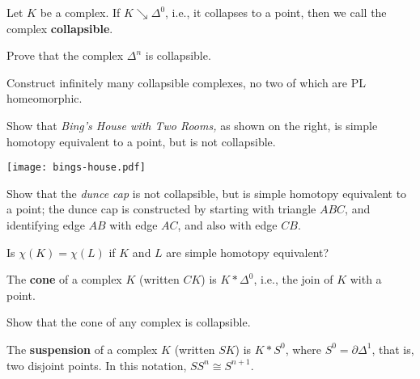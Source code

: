 \documentclass[12pt]{pset}
\newcommand{\boundary}{\partial}
\newcommand{\collapses}{\searrow}
\newcommand{\join}{\ast}
\begin{document}
\begin{definition*}
  Let $K$ be a complex.  If $K \collapses \Delta^0$, i.e., it
  collapses to a point, then we call the complex \textbf{collapsible}.
\end{definition*}

\begin{requiredproblem}
 Prove that the complex $\Delta^n$ is collapsible.
\end{requiredproblem}

\begin{problem}
  Construct infinitely many collapsible complexes, no two of which are
  PL homeomorphic.
\end{problem}

\noindent\parbox{0.75\textwidth}{%
\begin{problem}
Show that \textit{Bing's House with Two Rooms,} as shown on the right,
is simple homotopy equivalent to a point, but is not collapsible.
\end{problem}}%
\hspace{5pt}%
\parbox{0.25\textwidth}{%
\texttt{[image: bings-house.pdf]}%
}

\begin{problem}
  Show that the \textit{dunce cap} is not collapsible,
  but is simple homotopy equivalent to a point; the dunce cap is
  constructed by starting with triangle $ABC$, and identifying edge
  $AB$ with edge $AC$, and also with edge $CB$.
\end{problem}

\begin{requiredproblem}
  Is $\chi(K) = \chi(L)$ if $K$ and $L$ are simple homotopy equivalent?
\end{requiredproblem}

\begin{definition*}
  The \textbf{cone} of a complex $K$ (written $CK$) is $K \join
  \Delta^0$, i.e., the join of $K$ with a point.
\end{definition*}

\begin{requiredproblem}
  Show that the cone of any complex is collapsible.
\end{requiredproblem}

\begin{definition*}
  The \textbf{suspension} of a complex $K$ (written $SK$) is $K \join
  S^0$, where $S^0 = \boundary \Delta^1$, that is, two disjoint
  points.  In this notation, $SS^n \cong S^{n+1}$.
\end{definition*}
\end{document}
